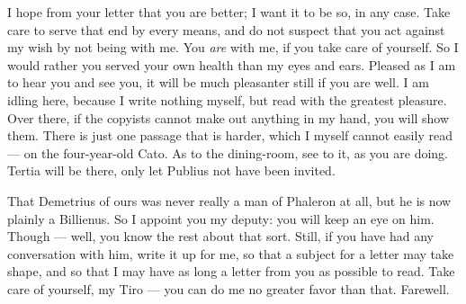 

 I hope from your letter that you are better; I want it to be so, in any case. Take care to serve that end by every means, and do not suspect that you act against my wish by not being with me. You \textit{are} with me, if you take care of yourself. So I would rather you served your own health than my eyes and ears. Pleased as I am to hear you and see you, it will be much pleasanter still if you are well. I am idling here, because I write nothing myself, but read with the greatest pleasure. Over there, if the copyists cannot make out anything in my hand, you will show them. There is just one passage that is harder, which I myself cannot easily read --- on the four-year-old Cato. As to the dining-room, see to it, as you are doing. Tertia will be there, only let Publius not have been invited.

 That Demetrius of ours was never really a man of Phaleron at all, but he is now plainly a Billienus. So I appoint you my deputy: you will keep an eye on him. Though --- well, you know the rest about that sort. Still, if you have had any conversation with him, write it up for me, so that a subject for a letter may take shape, and so that I may have as long a letter from you as possible to read. Take care of yourself, my Tiro --- you can do me no greater favor than that. Farewell.
